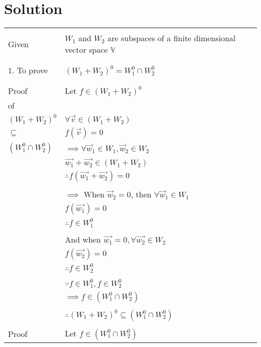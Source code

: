 \documentclass[journal,12pt]{IEEEtran}
\begin{document}
\section{Solution}
\renewcommand{\thetable}{1}
\begin{longtable}{|l|l|}
    \hline
        & \\
        Given &  $W_1$ and $W_2$ are subspaces of a finite dimensional vector space $\mathbb V$\\
        & \\
        \hline
        & \\
        1. To prove & $(W_1 + W_2)^0 = W_1^0 \cap W_2^0$\\
        & \\
    \hline
        & \\
        Proof & Let $f \in (W_1 + W_2)^0$\\
        of & \\
        $(W_1 + W_2)^0$ & $\forall \vec{v} \in (W_1 + W_2)$\\
        $\subseteq$ & $f(\vec{v}) = 0$\\
        $(W_1^0 \cap W_2^0)$ & $\implies \forall \vec{w}_1 \in W_1, \vec{w}_2 \in W_2$\\
        & $\vec{w_1} + \vec{w_2} \in (W_1 + W_2)$\\
        & $\therefore f(\vec{w_1} + \vec{w_2}) = 0$\\
        & \\
        & $\implies$ When $\vec{w}_2 = 0$, then $\forall \vec{w}_1 \in W_1$\\
        & $f(\vec{w_1}) = 0$\\
        & $\therefore f \in W_1^0$\\
        &\\
        & And when $\vec{w_1} = 0, \forall \vec{w_2} \in W_2$\\
        & $f(\vec{w_2}) = 0$\\
        & $\therefore f \in W_2^0$\\
        & \\
        & $\because f \in W_1^0, f \in W_2^0$\\
        & $\implies f \in (W_1^0 \cap W_2^0)$\\
        & \\
        & $\therefore (W_1 + W_2)^0 \subseteq (W_1^0 \cap W_2^0)$\\
    \hline
        & \\
        Proof & Let $f \in (W_1^0 \cap W_2^0)$\\

\end{longtable}
\end{document}
